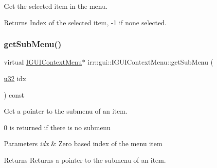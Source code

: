 Get the selected item in the menu. 

\begin{DoxyReturn}{Returns}
Index of the selected item, -\/1 if none selected. 
\end{DoxyReturn}
\mbox{\label{classirr_1_1gui_1_1IGUIContextMenu_a296cfd0c4944b2c0bfb88973401fb824}} 
\subsubsection{\texorpdfstring{get\+Sub\+Menu()}{getSubMenu()}\hspace{0.1cm}{\footnotesize\ttfamily [1/2]}}
{\footnotesize\ttfamily virtual \hyperlink{classirr_1_1gui_1_1IGUIContextMenu}{I\+G\+U\+I\+Context\+Menu}$\ast$ irr\+::gui\+::\+I\+G\+U\+I\+Context\+Menu\+::get\+Sub\+Menu (\begin{DoxyParamCaption}\item[{\hyperlink{namespaceirr_a0416a53257075833e7002efd0a18e804}{u32}}]{idx }\end{DoxyParamCaption}) const\hspace{0.3cm}{\ttfamily [pure virtual]}}



Get a pointer to the submenu of an item. 

0 is returned if there is no submenu 
\begin{DoxyParams}{Parameters}
{\em idx} & Zero based index of the menu item \\
\hline
\end{DoxyParams}
\begin{DoxyReturn}{Returns}
Returns a pointer to the submenu of an item. 
\end{DoxyReturn}
\mbox{\label{classirr_1_1gui_1_1IGUIContextMenu_a296cfd0c4944b2c0bfb88973401fb824}} 
